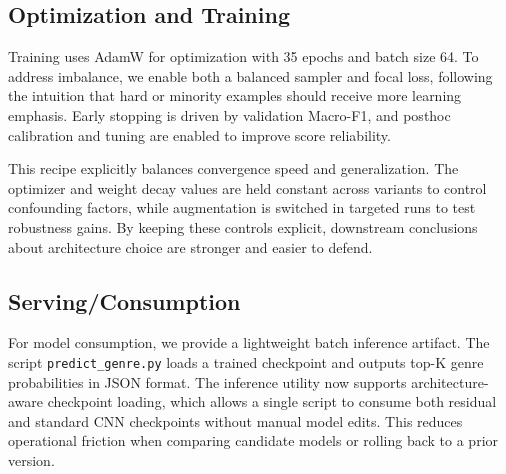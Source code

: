 \documentclass[11pt,a4paper]{article}
\begin{document}
\subsection{Optimization and Training}
Training uses AdamW for optimization with 35 epochs and batch size 64. To address imbalance, we enable both a balanced sampler and focal loss, following the intuition that hard or minority examples should receive more learning emphasis. Early stopping is driven by validation Macro-F1, and posthoc calibration and tuning are enabled to improve score reliability.

This recipe explicitly balances convergence speed and generalization. The optimizer and weight decay values are held constant across variants to control confounding factors, while augmentation is switched in targeted runs to test robustness gains. By keeping these controls explicit, downstream conclusions about architecture choice are stronger and easier to defend.

\subsection{Serving/Consumption}
For model consumption, we provide a lightweight batch inference artifact. The script \texttt{predict\_genre.py} loads a trained checkpoint and outputs top-K genre probabilities in JSON format. The inference utility now supports architecture-aware checkpoint loading, which allows a single script to consume both residual and standard CNN checkpoints without manual model edits. This reduces operational friction when comparing candidate models or rolling back to a prior version.
\end{document}
